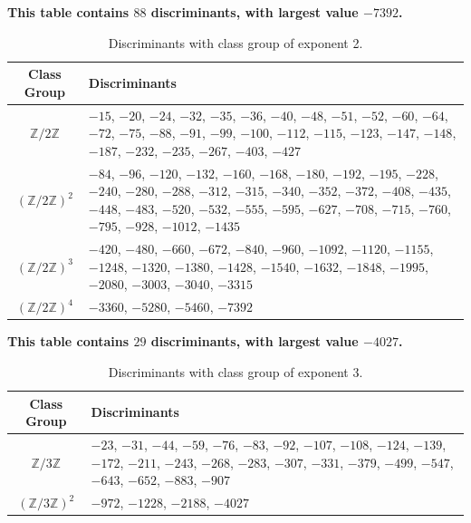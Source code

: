 \documentclass[11pt,letterpaper,reqno]{amsart}
\numberwithin{equation}{section}
\numberwithin{figure}{section}
\numberwithin{table}{section}
\newcommand{\ZZ}{\mathbb{Z}}
\begin{document}
\begin{table}[H]
\caption{Discriminants with class group of exponent 2.}
\begin{center}
\textbf{This table contains $88$ discriminants, with largest value $-7392$. \\ \vspace{2mm}}
\begin{tabular}{ c | p{125mm} } 
    \label{table:CMexp2}
    Class Group & Discriminants \\ 
    \hline
    $\ZZ/2\ZZ$ & $-15$, $-20$, $-24$, $-32$, $-35$, $-36$, $-40$, $-48$, $-51$, $-52$, $-60$, $-64$, $-72$, $-75$, $-88$, $-91$, $-99$, $-100$, $-112$, $-115$, $-123$, $-147$, $-148$, $-187$, $-232$, $-235$, $-267$, $-403$, $-427$ \\
    \hline
    $(\ZZ/2\ZZ)^{2}$ & $-84$, $-96$, $-120$, $-132$, $-160$, $-168$, $-180$, $-192$, $-195$, $-228$, $-240$, $-280$, $-288$, $-312$, $-315$, $-340$, $-352$, $-372$, $-408$, $-435$, $-448$, $-483$, $-520$, $-532$, $-555$, $-595$, $-627$, $-708$, $-715$, $-760$, $-795$, $-928$, $-1012$, $-1435$ \\
    \hline
    $(\ZZ/2\ZZ)^{3}$ & $-420$, $-480$, $-660$, $-672$, $-840$, $-960$, $-1092$, $-1120$, $-1155$, $-1248$, $-1320$, $-1380$, $-1428$, $-1540$, $-1632$, $-1848$, $-1995$, $-2080$, $-3003$, $-3040$, $-3315$ \\
    \hline
    $(\ZZ/2\ZZ)^{4}$ & $-3360$, $-5280$, $-5460$, $-7392$ \\
    \hline
\end{tabular}
\end{center}
\end{table}



\begin{table}[H]
\caption{Discriminants with class group of exponent 3.}
\begin{center}
\textbf{This table contains $29$ discriminants, with largest value $-4027$. \\ \vspace{2mm}}
\begin{tabular}{ c | p{125mm} } 
    \label{table:CMexp3}
    Class Group & Discriminants \\ 
    \hline
    $\ZZ/3\ZZ$ & $-23$, $-31$, $-44$, $-59$, $-76$, $-83$, $-92$, $-107$, $-108$, $-124$, $-139$, $-172$, $-211$, $-243$, $-268$, $-283$, $-307$, $-331$, $-379$, $-499$, $-547$, $-643$, $-652$, $-883$, $-907$ \\
    \hline
    $(\ZZ/3\ZZ)^{2}$ & $-972$, $-1228$, $-2188$, $-4027$ \\
    \hline
\end{tabular}
\end{center}
\end{table}
\end{document}
